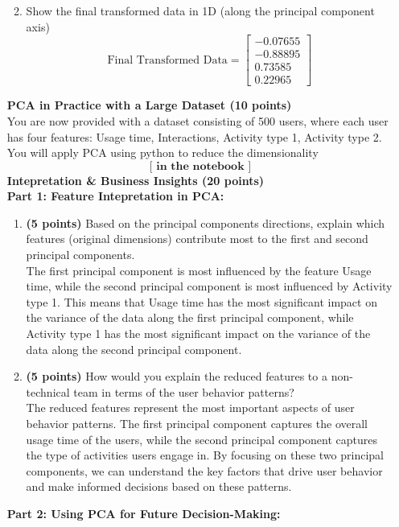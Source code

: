 \documentclass[a3paper,12pt]{extarticle} %
\begin{document}
\begin{enumerate}
\begin{enumerate}
\[        \]
        \item Show the final transformed data in 1D (along the principal component axis)
        \[
        \text{Final Transformed Data} = \begin{bmatrix}-0.07655\\-0.88895\\0.73585\\0.22965\end{bmatrix}
        \]
    \end{enumerate}
    \subitem \textbf{PCA in Practice with a Large Dataset (10 points)} 
    \\ You are now provided with a dataset consisting of 500 users, where each user has four features: Usage time, Interactions, Activity type 1, Activity type 2. You will apply PCA using python to reduce the dimensionality
    \[
     \textbf{[ in the notebook ]}
    \]
    \subitem \textbf{Intepretation \& Business Insights (20 points)}
    \\ \subitem \textbf{Part 1: Feature Intepretation in PCA:}
    \begin{enumerate}
        \item \textbf{(5 points)} Based on the principal components directions, explain which features (original dimensions) contribute most to the first and second principal components.
        \\ The first principal component is most influenced by the feature Usage time, while the second principal component is most influenced by Activity type 1. This means that Usage time has the most significant impact on the variance of the data along the first principal component, while Activity type 1 has the most significant impact on the variance of the data along the second principal component.
        \item \textbf{(5 points)} How would you explain the reduced features to a non-technical team in terms of the user behavior patterns?
        \\ The reduced features represent the most important aspects of user behavior patterns. The first principal component captures the overall usage time of the users, while the second principal component captures the type of activities users engage in. By focusing on these two principal components, we can understand the key factors that drive user behavior and make informed decisions based on these patterns.
    \end{enumerate}
    \subitem \textbf{Part 2: Using PCA for Future Decision-Making:}
    \begin{enumerate}

\end{enumerate}
\end{enumerate}
\end{document}

